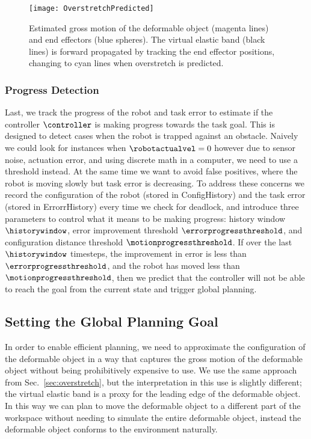\begin{figure}[ht]
    \centering
    \texttt{[image: OverstretchPredicted]}
    \caption{Estimated gross motion of the deformable object (magenta lines) and end effectors (blue spheres). The virtual elastic band (black lines) is forward propagated by tracking the end effector positions, changing to cyan lines when overstretch is predicted.}
    \label{fig:overstretch_predicted}
\end{figure}







\subsubsection{Progress Detection}

Last, we track the progress of the robot and task error to estimate if the controller $\controller$ is making progress towards the task goal. This is designed to detect cases when the robot is trapped against an obstacle. Naively we could look for instances when $\robotactualvel = 0$ however due to sensor noise, actuation error, and using discrete math in a computer, we need to use a threshold instead. At the same time we want to avoid false positives, where the robot is moving slowly but task error is decreasing. To address these concerns we record the configuration of the robot (stored in ConfigHistory) and the task error (stored in ErrorrHistory) every time we check for deadlock, and introduce three parameters to control what it means to be making progress: history window $\historywindow$, error improvement threshold $\errorprogressthreshold$, and configuration distance threshold $\motionprogressthreshold$. If over the last $\historywindow$ timesteps, the improvement in error is less than $\errorprogressthreshold$, and the robot has moved less than $\motionprogressthreshold$, then we predict that the controller will not be able to reach the goal from the current state and trigger global planning.



\subsection{Setting the Global Planning Goal}
\label{sec:planning_goal}


In order to enable efficient planning, we need to approximate the configuration of the deformable object in a way that captures the gross motion of the deformable object without being prohibitively expensive to use. We use the same approach from Sec.~\ref{sec:overstretch}, but the interpretation in this use is slightly different; the virtual elastic band is a proxy for the leading edge of the deformable object. In this way we can plan to move the deformable object to a different part of the workspace without needing to simulate the entire deformable object, instead the deformable object conforms to the environment naturally.



